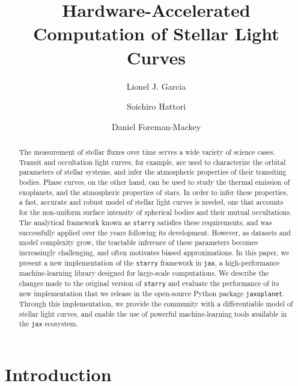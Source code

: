 \documentclass[modern]{aastex631}
\begin{document}
\title{Hardware-Accelerated Computation of Stellar Light Curves}

\author{Lionel J. Garcia}
\author{Soichiro Hattori}
\author{Daniel Foreman-Mackey}

\keywords{}

\begin{abstract}
    The measurement of stellar fluxes over time serves a wide variety of science cases. Transit and occultation light curves, for example, are used to characterize the orbital parameters of stellar systems, and infer the atmospheric properties of their transiting bodies. Phase curves, on the other hand, can be used to study the thermal emission of exoplanets, and the atmospheric properties of stars. In order to infer these properties, a fast, accurate and robust model of stellar light curves is needed, one that accounts for the non-uniform surface intensity of spherical bodies and their mutual occultations. The analytical framework known as \texttt{starry} satisfies these requirements, and was successfully applied over the years following its development. However, as datasets and model complexity grow, the tractable inference of these parameters becomes increasingly challenging, and often motivates biased approximations. In this paper, we present a new implementation of the \texttt{starry} framework in \texttt{jax}, a high-performance machine-learning library designed for large-scale computations. We describe the changes made to the original version of \texttt{starry} and evaluate the performance of its new implementation that we release in the open-source Python package \texttt{jaxoplanet}. Through this implementation, we provide the community with a differentiable model of stellar light curves, and enable the use of powerful machine-learning tools available in the \texttt{jax} ecosystem.

\end{abstract}

\section*{Introduction}

\end{document}
